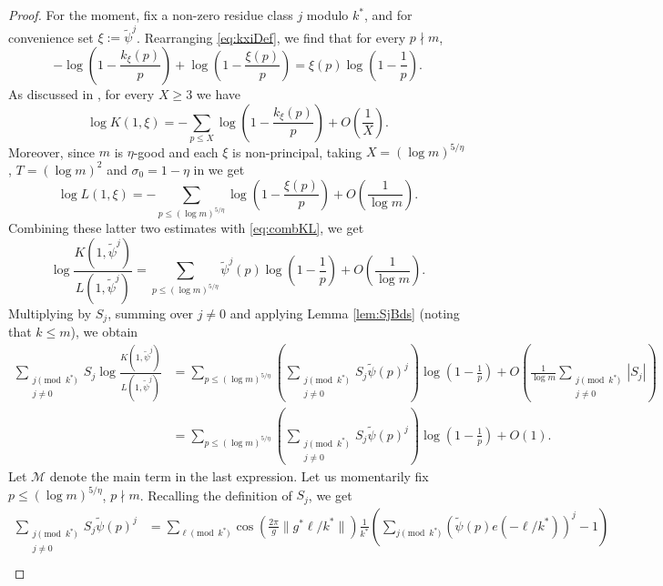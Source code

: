 \documentclass[10pt]{amsart}
\theoremstyle{definition}
\newcommand{\mc}{\mathcal}
\newcommand{\sg}{\sigma}
\renewcommand{\ss}{\substack}
\begin{document}
\begin{proof}
For the moment, fix a non-zero residue class $j$ modulo $k^\ast$, and for convenience set $\xi := \tilde{\psi}^j$. Rearranging \eqref{eq:kxiDef}, we find that for every $p \nmid m$,
\begin{equation}\label{eq:combKL}
-\log\left(1-\frac{k_{\xi}(p)}{p}\right) + \log\left(1-\frac{\xi(p)}{p}\right) = \xi(p) \log\left(1-\frac{1}{p}\right).
\end{equation}
As discussed in \cite[Sec. 4]{LamMan}, for every $X\geq 3$ we have
$$
\log K(1,\xi) = -\sum_{p \leq X} \log\left(1-\frac{k_{\xi}(p)}{p}\right) + O\left(\frac{1}{X}\right).
$$
Moreover, since $m$ is $\eta$-good and each $\xi$ is non-principal,
taking $X = (\log m)^{5/\eta}$, $T = (\log m)^{2}$ and $\sg_0 = 1-\eta$ in \cite[Lem. 3.4]{LamMan} we get
$$
\log L(1,\xi) = -\sum_{p\leq (\log m)^{5/\eta}} \log\left(1-\frac{\xi(p)}{p}\right) + O\left(\frac{1}{\log m}\right).
$$
Combining these latter two estimates with \eqref{eq:combKL}, we get
$$
\log\frac{K(1,\tilde{\psi}^j)}{L(1,\tilde{\psi}^j)} = \sum_{p \leq (\log m)^{5/\eta}} \tilde{\psi}^j(p) \log\left(1-\frac{1}{p}\right) + O\left(\frac{1}{\log m}\right).
$$
Multiplying by $S_j$, summing over $j \neq 0$ and applying Lemma \ref{lem:SjBds} (noting that $k \leq m$), we obtain
\begin{align*}
\sum_{\ss{j \pmod{k^\ast} \\ j \neq 0}} S_j \log \frac{K(1,\tilde{\psi}^j)}{L(1,\tilde{\psi}^j)} &= \sum_{p \leq (\log m)^{5/\eta}} \left(\sum_{\ss{j \pmod{k^\ast} \\ j \neq 0}} S_j \tilde{\psi}(p)^j\right) \log\left(1-\frac{1}{p}\right) + O\left(\frac{1}{\log m}\sum_{\ss{j \pmod{k^\ast} \\ j \neq 0}} |S_j|\right) \\
&= \sum_{p \leq (\log m)^{5/\eta}} \left(\sum_{\ss{j \pmod{k^\ast} \\ j \neq 0}} S_j \tilde{\psi}(p)^j\right) \log\left(1-\frac{1}{p}\right) + O(1).
\end{align*}
Let $\mc{M}$ denote the main term in the last expression. Let us momentarily fix $p \leq (\log m)^{5/\eta}$, $p \nmid m$. Recalling the definition of $S_j$, we get
\begin{align*}
\sum_{\ss{j \pmod{k^\ast} \\ j \neq 0}} S_j \tilde{\psi}(p)^j &= \sum_{\ell \pmod{k^\ast}} \cos(\tfrac{2\pi}{g}\|g^\ast \ell /k^\ast\|) \frac{1}{k^\ast} \left(\sum_{j \pmod{k^\ast}} (\tilde{\psi}(p) e(-\ell/k^\ast))^j - 1\right) \\

\end{align*}
\end{proof}
\end{document}
